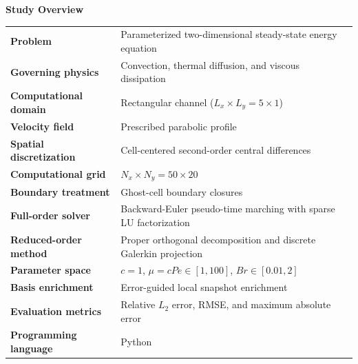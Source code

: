 \documentclass[11pt,a4paper]{article}
\begin{document}
\begin{center}
    \textbf{Study Overview}

    \vspace{0.15cm}

    {\small
    \renewcommand{\arraystretch}{1.15}
    \setlength{\tabcolsep}{5pt}

    \begin{tabular}{@{}p{}p{}@{}}
        \toprule
        \textbf{Problem} &
        Parameterized two-dimensional steady-state energy equation \\

        \textbf{Governing physics} &
        Convection, thermal diffusion, and viscous dissipation \\

        \textbf{Computational domain} &
        Rectangular channel ($L_x\times L_y=5\times1$) \\

        \textbf{Velocity field} &
        Prescribed parabolic profile \\

        \textbf{Spatial discretization} &
        Cell-centered second-order central differences \\

        \textbf{Computational grid} &
        $N_x\times N_y=50\times20$ \\

        \textbf{Boundary treatment} &
        Ghost-cell boundary closures \\

        \textbf{Full-order solver} &
        Backward-Euler pseudo-time marching with sparse LU factorization \\

        \textbf{Reduced-order method} &
        Proper orthogonal decomposition and discrete Galerkin projection \\

        \textbf{Parameter space} &
        $c=1$, $\mu=cPe\in[1,100]$, $Br\in[0.01,2]$ \\

        \textbf{Basis enrichment} &
        Error-guided local snapshot enrichment \\

        \textbf{Evaluation metrics} &
        Relative $L_2$ error, RMSE, and maximum absolute error \\

        \textbf{Programming language} &
        Python \\
        \bottomrule
    \end{tabular}
    }
\end{center}
\end{document}
